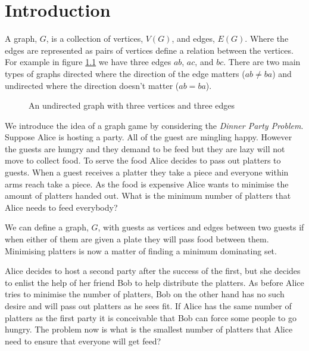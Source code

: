 \chapter{Introduction}\label{chpt:into}
A graph, $G$, is a collection of vertices, $V(G)$, and edges, $E(G)$. Where the edges are represented as pairs of vertices define a relation between the vertices. For example in figure \ref{fig:k3} we have three edges $ab$, $ac$, and $bc$. There are two main types of graphs directed where the direction of the edge matters ($ab\neq ba$) and undirected where the direction doesn't matter ($ab=ba$).

\begin{figure}[h]
    \centering
{}
    \caption{An undirected graph with three vertices and three edges}
\label{fig:k3}
\end{figure}
   
We introduce the idea of a graph game by considering the \textit{Dinner Party Problem}.
Suppose Alice is hosting a party. All of the guest are mingling happy. However the guests are hungry and they demand to be feed but they are lazy will not move to collect food. To serve the food Alice decides to pass out platters to guests. When a guest receives a platter they take a piece and everyone within arms reach take a piece. As the food is expensive Alice wants to minimise the amount of platters handed out. What is the minimum number of platters that Alice needs to feed everybody? 

We can define a graph, $G$, with guests as vertices and edges between two guests if when either of them are given a plate they will pass food between them. Minimising platters is now a matter of finding a minimum dominating set.

Alice decides to host a second party after the success of the first, but she decides to enlist the help of her friend Bob to help distribute the platters. As before Alice tries to minimise the number of platters, Bob on the other hand has no such desire and will pass out platters as he sees fit. If Alice has the same number of platters as the first party it is conceivable that Bob can force some people to go hungry. The problem now is what is the smallest number of platters that Alice need to ensure that everyone will get feed? 

